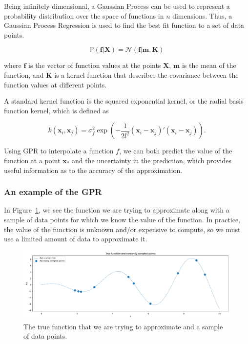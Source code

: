 \documentclass{article}
\begin{document}
Being infinitely dimensional, a Gaussian Process can be used to represent a probability distribution over the space of functions in $n$ dimensions. Thus, a Gaussian Process Regression is used to find the best fit function to a set of data points.

\begin{equation}
\mathbb{P}(\mathbf{f} | \mathbf{X}) = \mathcal{N}(\mathbf{f} | \mathbf{m}, \mathbf{K})
\end{equation}

where $\mathbf{f}$ is the vector of function values at the points $\mathbf{X}$, $\mathbf{m}$ is the mean of the function, and $\mathbf{K}$ is a kernel function that describes the covariance between the function values at different points.

A standard kernel function is the squared exponential kernel, or the radial basis function kernel, which is defined as

\begin{equation}
k(\mathbf{x}_i, \mathbf{x}_j) = \sigma^2_f \exp\left(-\frac{1}{2l^2} (\mathbf{x}_i - \mathbf{x}_j)' (\mathbf{x}_i - \mathbf{x}_j)\right).
\end{equation}

Using GPR to interpolate a function $f$, we can both predict the value of the function at a point $\mathbf{x}_*$ and the uncertainty in the prediction, which provides useful information as to the accuracy of the approximation.

\subsubsection{An example of the GPR}\label{An example of the GPR}

In Figure~\ref{fig:true_function}, we see the function we are trying to approximate along with a sample of data points for which we know the value of the function. In practice, the value of the function is unknown and/or expensive to compute, so we must use a limited amount of data to approximate it.

\begin{figure}[!htbp]
\centering
\includegraphics[width=0.7\linewidth]{files/true_function-01b57cd4c6548e84513aa8a8687433c4.pdf}
\caption{The true function that we are trying to approximate and a sample of data points.}
\label{fig:true_function}
\end{figure}
\end{document}

